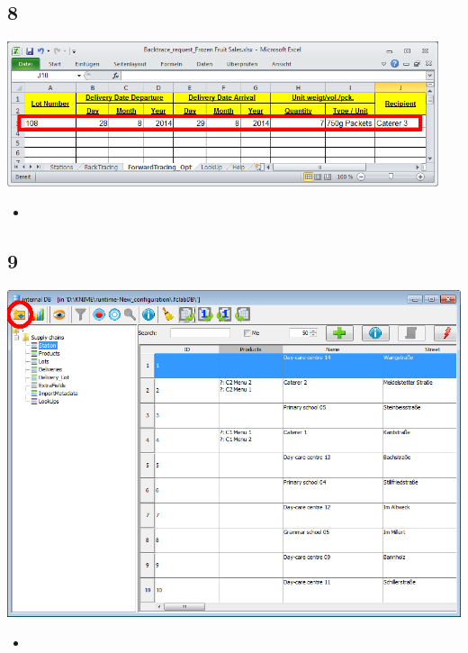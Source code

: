 \documentclass{beamer}
\begin{document}
\subsection{8}
\begin{frame}
	\begin{center}
  		\includegraphics[width=0.95\textwidth]{8.png}
	\end{center}
	\begin{itemize}
		\item
	\end{itemize}
\end{frame}

\subsection{9}
\begin{frame}
	\begin{center}
  		\includegraphics[height=0.6\textheight]{9.png}
	\end{center}
	\begin{itemize}
		\item
	\end{itemize}
\end{frame}
\end{document}
